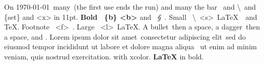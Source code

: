 \documentclass[11pt]{article}
\begin{document}
On \today\ many\textellipsis\ (the first use ends the run) and many\textellipsis{} the bar \textbar\ and \textbackslash\ and \{set\} and \textless x\textgreater{} in 11pt. \textbf{Bold \textbar\ \{b\} \textless b\textgreater} and \textit{\textbullet\ \S\ \textdegree}.
{\small Small \textbar\ \textbackslash\ \textless s\textgreater\ \LaTeX\ \textbullet\ and \TeX.} {\footnotesize Footnote \textbar\ \textless f\textgreater\ \textbf{\textbar}.} {\large Large \textbar\ \textless l\textgreater\ \LaTeX.}
A bullet\textbullet\ then a space, a dagger\dag\ then a space, and \texttrademark{} \textcopyright{} \textregistered.
Lorem ipsum dolor sit amet\textbullet\ consectetur adipiscing elit\textperiodcentered\ sed do eiusmod tempor incididunt ut labore et dolore magna aliqua \textbullet\ ut enim ad minim veniam, quis nostrud exercitation.
\LaTeXe{} with xcolor. \textbf{\LaTeX} in bold.
\end{document}
